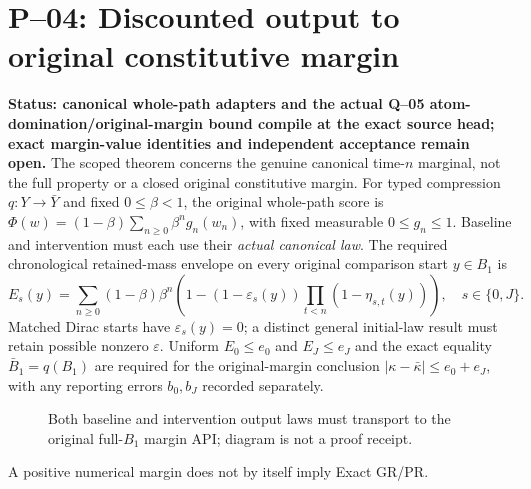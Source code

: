 \section{P--04: Discounted output to original constitutive margin}
\textbf{Status: canonical whole-path adapters and the actual Q--05 atom-domination/original-margin bound compile at the exact source head; exact margin-value identities and independent acceptance remain open.}
The scoped theorem  concerns
the genuine canonical time-$n$ marginal, not the full property or a
closed original constitutive margin.
For typed compression $q:Y\to\bar Y$ and fixed $0\le\beta<1$, the original
whole-path score is $\Phi(w)=(1-\beta)\sum_{n\ge0}\beta^n g_n(w_n)$,
with fixed measurable $0\le g_n\le1$.
Baseline and intervention must each use their \emph{actual canonical law}.
The required chronological retained-mass envelope on every original
comparison start $y\in B_1$ is
\[
E_s(y)=\sum_{n\ge0}(1-\beta)\beta^n
\left(1-(1-\varepsilon_s(y))\prod_{t<n}(1-\eta_{s,t}(y))\right)
,\quad s\in\{0,J\}.
\]
Matched Dirac starts have $\varepsilon_s(y)=0$; a distinct general
initial-law result must retain possible nonzero $\varepsilon$.
Uniform $E_0\le e_0$ and $E_J\le e_J$ and the exact equality
$\bar B_1=q(B_1)$ are required for the original-margin conclusion
$|\kappa-\bar\kappa|\le e_0+e_J$, with any reporting errors $b_0,b_J$
recorded separately.
\begin{figure}[htbp]\centering
{}
\caption{Both baseline and intervention output laws must transport to
the original full-$B_1$ margin API; diagram is not a proof receipt.}
\end{figure}
A positive numerical margin does not by itself imply Exact GR/PR.


